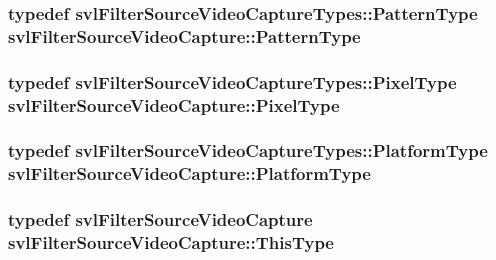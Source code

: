 \hypertarget{classsvl_filter_source_video_capture_a374a69b1d506cf982ba5ce45d5f84776}{
\subsubsection[{Pattern\-Type}]{\setlength{\rightskip}{0pt plus 5cm}typedef {\bf svl\-Filter\-Source\-Video\-Capture\-Types\-::\-Pattern\-Type} {\bf svl\-Filter\-Source\-Video\-Capture\-::\-Pattern\-Type}}}\label{classsvl_filter_source_video_capture_a374a69b1d506cf982ba5ce45d5f84776}
\hypertarget{classsvl_filter_source_video_capture_a0d92a26e94ffd48535df5ab2ff330c90}{
\subsubsection[{Pixel\-Type}]{\setlength{\rightskip}{0pt plus 5cm}typedef {\bf svl\-Filter\-Source\-Video\-Capture\-Types\-::\-Pixel\-Type} {\bf svl\-Filter\-Source\-Video\-Capture\-::\-Pixel\-Type}}}\label{classsvl_filter_source_video_capture_a0d92a26e94ffd48535df5ab2ff330c90}
\hypertarget{classsvl_filter_source_video_capture_a75f10dbd026c0ae70007a18758895ea0}{
\subsubsection[{Platform\-Type}]{\setlength{\rightskip}{0pt plus 5cm}typedef {\bf svl\-Filter\-Source\-Video\-Capture\-Types\-::\-Platform\-Type} {\bf svl\-Filter\-Source\-Video\-Capture\-::\-Platform\-Type}}}\label{classsvl_filter_source_video_capture_a75f10dbd026c0ae70007a18758895ea0}
\hypertarget{classsvl_filter_source_video_capture_ad91d138b62c181697b084d06a12fb55a}{
\subsubsection[{This\-Type}]{\setlength{\rightskip}{0pt plus 5cm}typedef {\bf svl\-Filter\-Source\-Video\-Capture} {\bf svl\-Filter\-Source\-Video\-Capture\-::\-This\-Type}}}\label{classsvl_filter_source_video_capture_ad91d138b62c181697b084d06a12fb55a}


